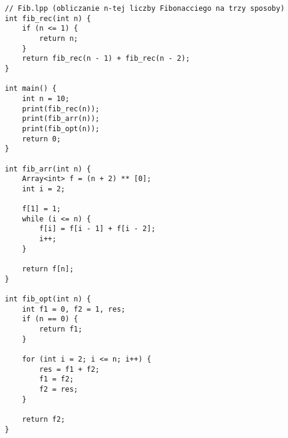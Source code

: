 \documentclass[a4paper]{article}
\begin{document}
\newpage
\begin{lstlisting}
// Fib.lpp (obliczanie n-tej liczby Fibonacciego na trzy sposoby)
int fib_rec(int n) {
    if (n <= 1) {
        return n;
    }
    return fib_rec(n - 1) + fib_rec(n - 2);
}

int main() {
    int n = 10;
    print(fib_rec(n));
    print(fib_arr(n));
    print(fib_opt(n));
    return 0;
}

int fib_arr(int n) {
    Array<int> f = (n + 2) ** [0];
    int i = 2;

    f[1] = 1;
    while (i <= n) {
        f[i] = f[i - 1] + f[i - 2];
        i++;
    }

    return f[n];
}

int fib_opt(int n) {
    int f1 = 0, f2 = 1, res;
    if (n == 0) {
        return f1;
    }

    for (int i = 2; i <= n; i++) {
        res = f1 + f2;
        f1 = f2;
        f2 = res;
    }

    return f2;
}
\end{lstlisting}
\end{document}
